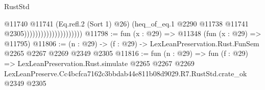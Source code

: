 \begin{lexlean}{RustStd}
\begin{coremodule}
                                          @11740
                                            @11741
                                            (Eq.refl.{2} (Sort 1) @26)
                                            (heq_of_eq.{1}
                                              @2290
                                              @11738
                                              @11741
                                              @2305)))))))))))))))))))))
@11798 := fun (x : @29) => @11348 (fun (x : @29) => @11795)
@11806 := (n : @29) -> (f : @29) -> LexLeanPreservation.Rust.FunSem @2265 @2267 @2269 @2349 @2305
@11816 := fun (n : @29) =>
  fun (f : @29) =>
  LexLeanPreservation.Rust.simulate
    @2265
    @2267
    @2269
    LexLeanPreserve.Cc4bcfca7162c3bbdab44e811b08d9029.R7.RustStd.crate_ok
    @2349
    @2305
\end{coremodule}
\end{lexlean}
